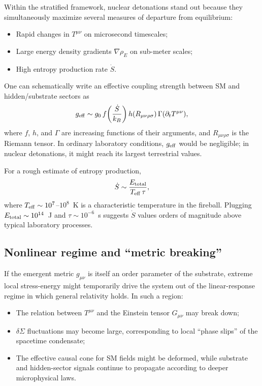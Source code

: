 \documentclass[aps,prd,twocolumn,nofootinbib,superscriptaddress]{revtex4-2}
\begin{document}
Within the stratified framework, nuclear detonations stand out because they simultaneously maximize several measures of departure from equilibrium:
\begin{itemize}
    \item Rapid changes in $T^{\mu\nu}$ on microsecond timescales;
    \item Large energy density gradients $\nabla \rho_E$ on sub-meter scales;
    \item High entropy production rate $\dot{S}$.
\end{itemize}
One can schematically write an effective coupling strength between SM and hidden/substrate sectors as
\begin{equation}
    g_{\rm eff} \sim g_0 \,
    f\!\left(\frac{\dot{S}}{k_B}\right)
    h(R_{\mu\nu\rho\sigma})
    \, \Gamma(\partial_t T^{\mu\nu}),
\end{equation}
where $f$, $h$, and $\Gamma$ are increasing functions of their arguments, and $R_{\mu\nu\rho\sigma}$ is the Riemann tensor. In ordinary laboratory conditions, $g_{\rm eff}$ would be negligible; in nuclear detonations, it might reach its largest terrestrial values.

For a rough estimate of entropy production,
\begin{equation}
    \dot{S} \sim \frac{E_{\rm total}}{T_{\rm eff} \, \tau},
\end{equation}
where $T_{\rm eff} \sim 10^7$--$10^8$~K is a characteristic temperature in the fireball. Plugging $E_{\rm total} \sim 10^{14}$~J and $\tau \sim 10^{-6}$~s suggests $\dot{S}$ values orders of magnitude above typical laboratory processes.

\subsection{Nonlinear regime and ``metric breaking''}

If the emergent metric $g_{\mu\nu}$ is itself an order parameter of the substrate, extreme local stress-energy might temporarily drive the system out of the linear-response regime in which general relativity holds. In such a region:
\begin{itemize}
    \item The relation between $T^{\mu\nu}$ and the Einstein tensor $G_{\mu\nu}$ may break down;
    \item $\delta\Sigma$ fluctuations may become large, corresponding to local ``phase slips'' of the spacetime condensate;
    \item The effective causal cone for SM fields might be deformed, while substrate and hidden-sector signals continue to propagate according to deeper microphysical laws.
\end{itemize}
\end{document}
